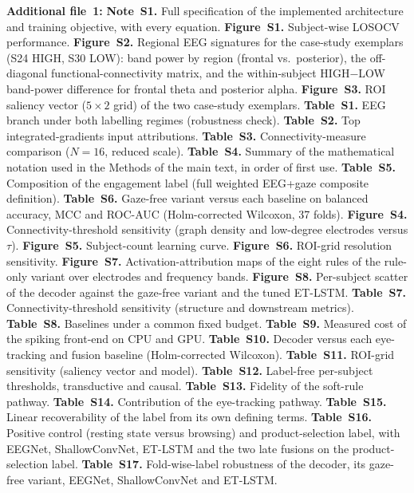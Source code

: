 \documentclass[pdflatex,sn-basic,Numbered,twocolumn,iicol]{sn-jnl}
\theoremstyle{thmstyleone}%
\theoremstyle{thmstyletwo}%
\theoremstyle{thmstylethree}%
\begin{document}
\noindent\textbf{Additional file~1:} \textbf{Note~S1.} Full specification of the implemented architecture and training objective, with every equation. \textbf{Figure~S1.} Subject-wise LOSOCV performance. \textbf{Figure~S2.} Regional EEG signatures for the case-study exemplars (S24 HIGH, S30 LOW): band power by region (frontal vs.\ posterior), the off-diagonal functional-connectivity matrix, and the within-subject HIGH$-$LOW band-power difference for frontal theta and posterior alpha. \textbf{Figure~S3.} ROI saliency vector ($5\times2$ grid) of the two case-study exemplars. \textbf{Table~S1.} EEG branch under both labelling regimes (robustness check). \textbf{Table~S2.} Top integrated-gradients input attributions. \textbf{Table~S3.} Connectivity-measure comparison ($N=16$, reduced scale). \textbf{Table~S4.} Summary of the mathematical notation used in the Methods of the main text, in order of first use. \textbf{Table~S5.} Composition of the engagement label (full weighted EEG+gaze composite definition). \textbf{Table~S6.} Gaze-free variant versus each baseline on balanced accuracy, MCC and ROC-AUC (Holm-corrected Wilcoxon, 37 folds). \textbf{Figure~S4.} Connectivity-threshold sensitivity (graph density and low-degree electrodes versus $\tau$). \textbf{Figure~S5.} Subject-count learning curve. \textbf{Figure~S6.} ROI-grid resolution sensitivity. \textbf{Figure~S7.} Activation-attribution maps of the eight rules of the rule-only variant over electrodes and frequency bands. \textbf{Figure~S8.} Per-subject scatter of the decoder against the gaze-free variant and the tuned ET-LSTM. \textbf{Table~S7.} Connectivity-threshold sensitivity (structure and downstream metrics). \textbf{Table~S8.} Baselines under a common fixed budget. \textbf{Table~S9.} Measured cost of the spiking front-end on CPU and GPU. \textbf{Table~S10.} Decoder versus each eye-tracking and fusion baseline (Holm-corrected Wilcoxon). \textbf{Table~S11.} ROI-grid sensitivity (saliency vector and model). \textbf{Table~S12.} Label-free per-subject thresholds, transductive and causal. \textbf{Table~S13.} Fidelity of the soft-rule pathway. \textbf{Table~S14.} Contribution of the eye-tracking pathway. \textbf{Table~S15.} Linear recoverability of the label from its own defining terms. \textbf{Table~S16.} Positive control (resting state versus browsing) and product-selection label, with EEGNet, ShallowConvNet, ET-LSTM and the two late fusions on the product-selection label. \textbf{Table~S17.} Fold-wise-label robustness of the decoder, its gaze-free variant, EEGNet, ShallowConvNet and ET-LSTM.
\end{document}
